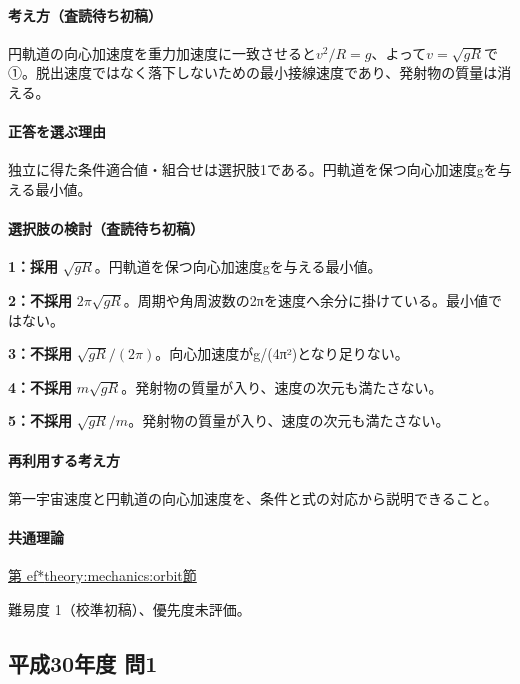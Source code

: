 \paragraph{考え方（査読待ち初稿）} 円軌道の向心加速度を重力加速度に一致させると\(v^2/R=g\)、よって\(v=\sqrt{gR}\)で①。脱出速度ではなく落下しないための最小接線速度であり、発射物の質量は消える。

\paragraph{正答を選ぶ理由} 独立に得た条件適合値・組合せは選択肢1である。円軌道を保つ向心加速度gを与える最小値。

\paragraph{選択肢の検討（査読待ち初稿）}

\noindent\textbf{1：採用} \(\sqrt{gR}\)。円軌道を保つ向心加速度gを与える最小値。\par

\noindent\textbf{2：不採用} \(2\pi\sqrt{gR}\)。周期や角周波数の2πを速度へ余分に掛けている。最小値ではない。\par

\noindent\textbf{3：不採用} \(\sqrt{gR}/(2\pi)\)。向心加速度がg/(4π²)となり足りない。\par

\noindent\textbf{4：不採用} \(m\sqrt{gR}\)。発射物の質量が入り、速度の次元も満たさない。\par

\noindent\textbf{5：不採用} \(\sqrt{gR}/m\)。発射物の質量が入り、速度の次元も満たさない。\par

\paragraph{再利用する考え方} 第一宇宙速度と円軌道の向心加速度を、条件と式の対応から説明できること。

\paragraph{共通理論} \hyperref[theory:mechanics:orbit]{第
ef*{theory:mechanics:orbit}節}

\par 難易度 1（校準初稿）、優先度未評価。

\subsection{平成30年度 問1}
\label{q:h30-reg-applied-01}

